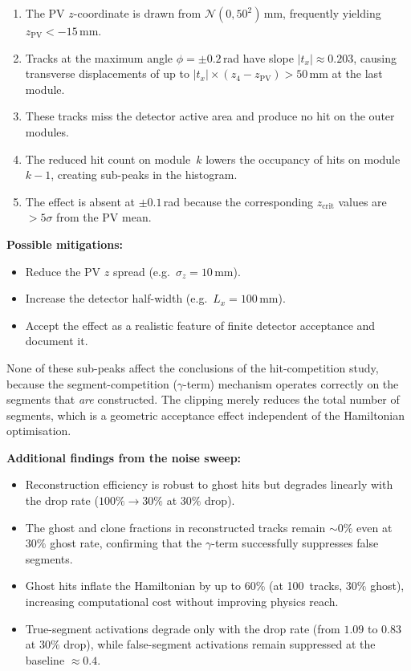 \documentclass[11pt,a4paper]{article}
\newcommand{\pvz}{z_{\mathrm{PV}}}
\newcommand{\zcrit}{z_{\mathrm{crit}}}
\newcommand{\halfx}{L_x}
\begin{document}
\begin{enumerate}
  \item The PV $z$-coordinate is drawn from $\mathcal{N}(0, 50^2)$\,mm,
        frequently yielding $\pvz < -15$\,mm.
  \item Tracks at the maximum angle $\phi = \pm 0.2$\,rad have slope
        $|t_x| \approx 0.203$, causing transverse displacements of up to
        $|t_x| \times (z_4 - \pvz) > 50$\,mm at the last module.
  \item These tracks miss the detector active area and produce no hit on
        the outer modules.
  \item The reduced hit count on module~$k$ lowers the occupancy of hits
        on module~$k{-}1$, creating sub-peaks in the histogram.
  \item The effect is absent at $\pm 0.1$\,rad because the corresponding
        $\zcrit$ values are $> 5\sigma$ from the PV mean.
\end{enumerate}

\noindent\textbf{Possible mitigations:}
\begin{itemize}
  \item Reduce the PV $z$ spread (e.g.\ $\sigma_z = 10$\,mm).
  \item Increase the detector half-width (e.g.\ $\halfx = 100$\,mm).
  \item Accept the effect as a realistic feature of finite detector
        acceptance and document it.
\end{itemize}

None of these sub-peaks affect the conclusions of the hit-competition
study, because the segment-competition ($\gamma$-term) mechanism operates
correctly on the segments that \emph{are} constructed.  The clipping merely
reduces the total number of segments, which is a geometric acceptance
effect independent of the Hamiltonian optimisation.

\noindent\textbf{Additional findings from the noise sweep:}
\begin{itemize}
  \item Reconstruction efficiency is robust to ghost hits but degrades
        linearly with the drop rate ($100\% \to 30\%$ at $30\%$ drop).
  \item The ghost and clone fractions in reconstructed tracks remain
        ${\sim}0\%$ even at $30\%$ ghost rate, confirming that the
        $\gamma$-term successfully suppresses false segments.
  \item Ghost hits inflate the Hamiltonian by up to $60\%$ (at 100~tracks,
        $30\%$ ghost), increasing computational cost without improving
        physics reach.
  \item True-segment activations degrade only with the drop rate (from
        $1.09$ to $0.83$ at $30\%$ drop), while false-segment activations
        remain suppressed at the baseline $\approx 0.4$.
\end{itemize}
\end{document}
